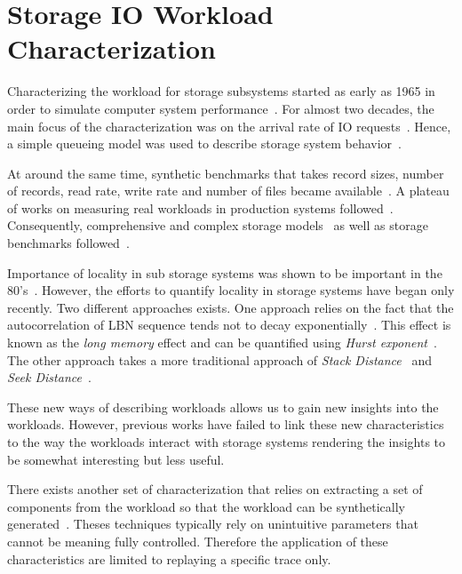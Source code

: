 \section{Storage IO Workload Characterization}

Characterizing the workload for storage subsystems started as early as 1965 in order to simulate computer system performance~\cite{hutchinson:1965}. 
For almost two decades, the main focus of the characterization was on the arrival rate of IO requests~\cite{hutchinson:1965, fuchel:1967, reddy:1989}. 
Hence, a simple queueing model was used to describe storage system behavior~\cite{kleinrock:1975}. 

At around the same time, synthetic benchmarks that takes record sizes, number of records, read rate, write rate and number of files became available~\cite{park:1990, wolman:1989}.
A plateau of works on measuring real workloads in production systems followed~\cite{ruemmler:1993, kavalanekar:2008, ahmad:2007, wang:2009, roselli:2000, calzarossa:1993, smirni:1997, calzarossa:2000, arlitt:1996, riska:2006}. 
Consequently, comprehensive and complex storage models~\cite{anderson:1968,brichet:1996,copeland:1985,freeman:1996,norros:1994} as well as storage benchmarks followed~\cite{traeger:2008}. 

Importance of locality in sub storage systems was shown to be important in the 80's~\cite{ousterhout:1985}. 
However, the efforts to quantify locality in storage systems have began only recently. 
Two different approaches exists. 
One approach relies on the fact that the autocorrelation of LBN sequence tends not to decay exponentially~\cite{denning:1972}.
This effect is known as the \emph{long memory} effect and can be quantified using \emph{Hurst exponent}~\cite{gomez:2000}.
The other approach takes a more traditional approach of \emph{Stack Distance}~\cite{mattson:1970} and \emph{Seek Distance}~\cite{fox:2008}.

These new ways of describing workloads allows us to gain new insights into the workloads.
However, previous works have failed to link these new characteristics to the way the workloads interact with storage systems rendering the insights to be somewhat interesting but less useful.

There exists another set of characterization that relies on extracting a set of components from the workload so that the workload can be synthetically generated~\cite{sreenivasan:1974}.
Theses techniques typically rely on unintuitive parameters that cannot be meaning fully controlled.
Therefore the application of these characteristics are limited to replaying a specific trace only.



